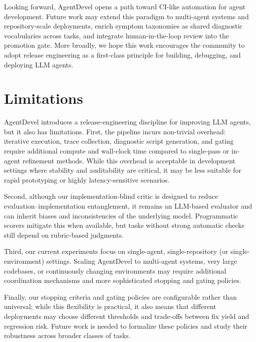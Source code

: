 \documentclass[11pt]{article}
\begin{document}
Looking forward, AgentDevel opens a path toward CI-like automation for agent development. Future work may extend this paradigm to multi-agent systems and repository-scale deployments, enrich symptom taxonomies as shared diagnostic vocabularies across tasks, and integrate human-in-the-loop review into the promotion gate. More broadly, we hope this work encourages the community to adopt release engineering as a first-class principle for building, debugging, and deploying LLM agents.











\appendix
\label{sec:appendix}
\section{Limitations}

AgentDevel introduces a release-engineering discipline for improving LLM agents, but it also has limitations. First, the pipeline incurs non-trivial overhead: iterative execution, trace collection, diagnostic script generation, and gating require additional compute and wall-clock time compared to single-pass or in-agent refinement methods. While this overhead is acceptable in development settings where stability and auditability are critical, it may be less suitable for rapid prototyping or highly latency-sensitive scenarios.

Second, although our implementation-blind critic is designed to reduce evaluation–implementation entanglement, it remains an LLM-based evaluator and can inherit biases and inconsistencies of the underlying model. Programmatic scorers mitigate this when available, but tasks without strong automatic checks still depend on rubric-based judgments.

Third, our current experiments focus on single-agent, single-repository (or single-environment) settings. Scaling AgentDevel to multi-agent systems, very large codebases, or continuously changing environments may require additional coordination mechanisms and more sophisticated stopping and gating policies.

Finally, our stopping criteria and gating policies are configurable rather than universal; while this flexibility is practical, it also means that different deployments may choose different thresholds and trade-offs between fix yield and regression risk. Future work is needed to formalize these policies and study their robustness across broader classes of tasks.
\end{document}
